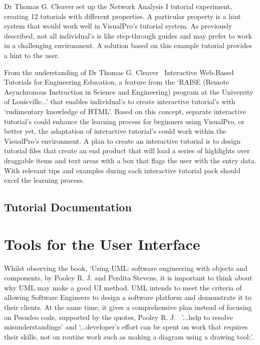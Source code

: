 \documentclass[12pt]{report} %
\begin{document}
		Dr Thomas G. Cleaver set up the Network Analysis I tutorial experiment, creating 12 tutorials with different properties. A particular property is a hint system that would work well in VisualPro's tutorial system. As previously described, not all individual's is like step-through guides and may prefer to work in a challenging environment. A solution based on this example tutorial provides a hint to the user.
		
		From the understanding of Dr Thomas G. Cleaver~\cite{cleaver_interactive_1999} Interactive Web-Based Tutorials for Engineering Education, a feature from the `RAISE (Remote Asynchronous Instruction in Science and Engineering) program at the University of Louisville...' that enables individual's to create interactive tutorial's with `rudimentary knowledge of HTML'. Based on this concept, separate interactive tutorial's could enhance the learning process for beginners using VisualPro, or better yet, the adaptation of interactive tutorial's could work within the VisualPro's environment. A plan to create an interactive tutorial is to design tutorial files that create an end product that will load a series of highlights over draggable items and text areas with a box that flags the user with the entry data. With relevant tips and examples during each interactive tutorial pack should excel the learning process.

		

		\subsection{Tutorial Documentation}
		

	\section{Tools for the User Interface}  
		Whilst observing the book, `Using UML: software engineering with objects and components, by Pooley R. J. and Perdita Stevens\cite{pooley_r_j_using_2006}, it is important to think about why UML may make a good UI method. UML intends to meet the criteria of allowing Software Engineers to design a software platform and demonstrate it to their clients. At the same time, it gives a comprehensive plan instead of focusing on Pesudeo code, supported by the quotes, Pooley R. J.~\cite{pooley_r_j_using_2006} '...help to resolve misunderstandings' and `...developer's effort can be spent on work that requires their skills, not on routine work such as making a diagram using a drawing tool;'.
		
\end{document}
